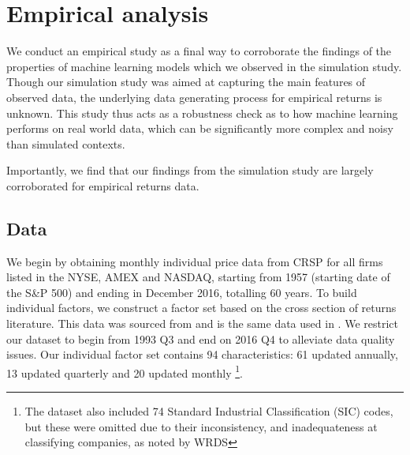\documentclass{article}
\begin{document}

\section{Empirical analysis}
We conduct an empirical study as a final way to corroborate the findings of the properties of machine learning models which we observed in the simulation study. Though our simulation study was aimed at capturing the main features of observed data, the underlying data generating process for empirical returns is unknown. This study thus acts as a robustness check as to how machine learning performs on real world data, which can be significantly more complex and noisy than simulated contexts. 

Importantly, we find that our findings from the simulation study are largely corroborated for empirical returns data.

\subsection{Data}
We begin by obtaining monthly individual price data from CRSP for all firms listed in the NYSE, AMEX and NASDAQ, starting from 1957 (starting date of the S\&P 500) and ending in December 2016, totalling 60 years. To build individual factors, we construct a factor set based on the cross section of returns literature. This data was sourced from and is the same data used in \cite{gu_empirical_2018}. We restrict our dataset to begin from 1993 Q3 and end on 2016 Q4 to alleviate data quality issues. Our individual factor set contains 94 characteristics: 61 updated annually, 13 updated quarterly and 20 updated monthly \footnote{The dataset also included 74 Standard Industrial Classification (SIC) codes, but these were omitted due to their inconsistency, and inadequateness at classifying companies, as noted by WRDS}.
\end{document}
